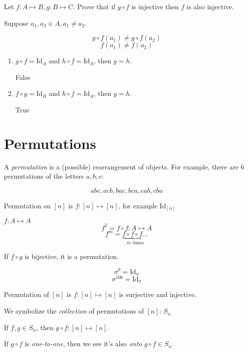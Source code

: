\documentclass[00_complete]{subfiles}
\begin{document}
\begin{example}
    \begin{enumerate}
Let $f: A \mapsto B, g: B \mapsto C$. Prove that if $g \circ f$ is injective
then $f$ is also injective.

Suppose $a_1, a_2 \in A, a_1 \neq a_2$.

$$g \circ f(a_1) \neq g \circ f(a_2)$$
$$f(a_1) \neq f(a_2)$$
    \end{enumerate}
\end{example}

\begin{example}
\begin{enumerate}
Let $f: A \mapsto B, g: B \mapsto A, h: B \mapsto A$

 \item $g \circ f = \mathrm{Id}_A$ and $h \circ f = \mathrm{Id}_A$, then $g=h$.

False

\item $f \circ g = \mathrm{Id}_B$ and $h \circ f = \mathrm{Id}_A$, then $g=h$.

True
\end{enumerate}
\end{example}

\section{Permutations}

A \emph{permutation} is a (possible) rearrangement of objects. For example,
there are 6 permutations of the letters $a, b, c$:

$$abc, acb, bac, bca, cab, cba$$

Permutation on $[n]$ is $f: [n] \mapsto [n]$, for example $\mathrm{Id}_{[n]}$

$f: A \mapsto A$
$$f^2 = f \circ f: A \mapsto A$$
$$f^m = \underbrace{f \circ f \circ f \ldots}_{m \text{ times}}$$

If $f \circ g$ is bijective, it is a permutation.

$$\sigma^6 = \mathrm{Id}_{\sigma}$$
$$\sigma^{100} = \mathrm{Id}_{\sigma}$$


\begin{definition}[Permutation]
Permutation of $[n]$ is $f: [n] \mapsto [n]$ is surjective and injective.

We symbolize the \emph{collection} of permutations of $[n]$: $S_n$

If $f, g \in S_n$, then $g \circ f: [n] \mapsto [n]$.

If $g \circ f$ is \emph{one-to-one}, then we see it's also \emph{onto} $g \circ
f \in S_n$.

\end{definition}
\end{document}
